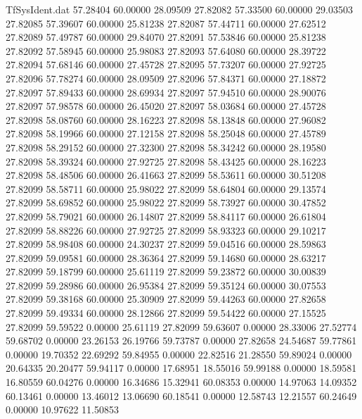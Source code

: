 \begin{filecontents}{TfSysIdent.dat}
  57.28404   60.00000   28.09509   27.82082
  57.33500   60.00000   29.03503   27.82085
  57.39607   60.00000   25.81238   27.82087
  57.44711   60.00000   27.62512   27.82089
  57.49787   60.00000   29.84070   27.82091
  57.53846   60.00000   25.81238   27.82092
  57.58945   60.00000   25.98083   27.82093
  57.64080   60.00000   28.39722   27.82094
  57.68146   60.00000   27.45728   27.82095
  57.73207   60.00000   27.92725   27.82096
  57.78274   60.00000   28.09509   27.82096
  57.84371   60.00000   27.18872   27.82097
  57.89433   60.00000   28.69934   27.82097
  57.94510   60.00000   28.90076   27.82097
  57.98578   60.00000   26.45020   27.82097
  58.03684   60.00000   27.45728   27.82098
  58.08760   60.00000   28.16223   27.82098
  58.13848   60.00000   27.96082   27.82098
  58.19966   60.00000   27.12158   27.82098
  58.25048   60.00000   27.45789   27.82098
  58.29152   60.00000   27.32300   27.82098
  58.34242   60.00000   28.19580   27.82098
  58.39324   60.00000   27.92725   27.82098
  58.43425   60.00000   28.16223   27.82098
  58.48506   60.00000   26.41663   27.82099
  58.53611   60.00000   30.51208   27.82099
  58.58711   60.00000   25.98022   27.82099
  58.64804   60.00000   29.13574   27.82099
  58.69852   60.00000   25.98022   27.82099
  58.73927   60.00000   30.47852   27.82099
  58.79021   60.00000   26.14807   27.82099
  58.84117   60.00000   26.61804   27.82099
  58.88226   60.00000   27.92725   27.82099
  58.93323   60.00000   29.10217   27.82099
  58.98408   60.00000   24.30237   27.82099
  59.04516   60.00000   28.59863   27.82099
  59.09581   60.00000   28.36364   27.82099
  59.14680   60.00000   28.63217   27.82099
  59.18799   60.00000   25.61119   27.82099
  59.23872   60.00000   30.00839   27.82099
  59.28986   60.00000   26.95384   27.82099
  59.35124   60.00000   30.07553   27.82099
  59.38168   60.00000   25.30909   27.82099
  59.44263   60.00000   27.82658   27.82099
  59.49334   60.00000   28.12866   27.82099
  59.54422   60.00000   27.15525   27.82099
  59.59522    0.00000   25.61119   27.82099
  59.63607    0.00000   28.33006   27.52774
  59.68702    0.00000   23.26153   26.19766
  59.73787    0.00000   27.82658   24.54687
  59.77861    0.00000   19.70352   22.69292
  59.84955    0.00000   22.82516   21.28550
  59.89024    0.00000   20.64335   20.20477
  59.94117    0.00000   17.68951   18.55016
  59.99188    0.00000   18.59581   16.80559
  60.04276    0.00000   16.34686   15.32941
  60.08353    0.00000   14.97063   14.09352
  60.13461    0.00000   13.46012   13.06690
  60.18541    0.00000   12.58743   12.21557
  60.24649    0.00000   10.97622   11.50853

\end{filecontents}
